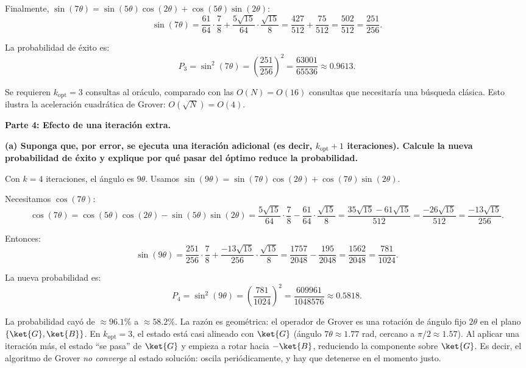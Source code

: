 Finalmente, $\sin(7\theta) = \sin(5\theta)\cos(2\theta) + \cos(5\theta)\sin(2\theta)$:
$$
    \sin(7\theta) = \frac{61}{64}\cdot\frac{7}{8} + \frac{5\sqrt{15}}{64}\cdot\frac{\sqrt{15}}{8} = \frac{427}{512} + \frac{75}{512} = \frac{502}{512} = \frac{251}{256}.
$$

La probabilidad de éxito es:
$$
    \boxed{P_3 = \sin^2(7\theta) = \left(\frac{251}{256}\right)^2 = \frac{63001}{65536} \approx 0.9613.}
$$

Se requieren $k_{\text{opt}} = 3$ consultas al oráculo, comparado con las $O(N) = O(16)$ consultas que necesitaría una búsqueda clásica. Esto ilustra la aceleración cuadrática de Grover: $O(\sqrt{N}) = O(4)$.

\vspace{0.5cm}

{\bfseries Parte 4: Efecto de una iteración extra.}

{\bfseries (a) Suponga que, por error, se ejecuta una iteración adicional (es decir, $k_{\text{opt}}+1$ iteraciones). Calcule la nueva probabilidad de éxito y explique por qué pasar del óptimo reduce la probabilidad.}

Con $k = 4$ iteraciones, el ángulo es $9\theta$. Usamos $\sin(9\theta) = \sin(7\theta)\cos(2\theta) + \cos(7\theta)\sin(2\theta)$.

Necesitamos $\cos(7\theta)$:
$$
    \cos(7\theta) = \cos(5\theta)\cos(2\theta) - \sin(5\theta)\sin(2\theta) = \frac{5\sqrt{15}}{64}\cdot\frac{7}{8} - \frac{61}{64}\cdot\frac{\sqrt{15}}{8} = \frac{35\sqrt{15} - 61\sqrt{15}}{512} = \frac{-26\sqrt{15}}{512} = \frac{-13\sqrt{15}}{256}.
$$

Entonces:
$$
    \sin(9\theta) = \frac{251}{256}\cdot\frac{7}{8} + \frac{-13\sqrt{15}}{256}\cdot\frac{\sqrt{15}}{8} = \frac{1757}{2048} - \frac{195}{2048} = \frac{1562}{2048} = \frac{781}{1024}.
$$

La nueva probabilidad es:
$$
    \boxed{P_4 = \sin^2(9\theta) = \left(\frac{781}{1024}\right)^2 = \frac{609961}{1048576} \approx 0.5818.}
$$

La probabilidad cayó de $\approx 96.1\%$ a $\approx 58.2\%$. La razón es geométrica: el operador de Grover es una rotación de ángulo fijo $2\theta$ en el plano $\{\ket{G}, \ket{B}\}$. En $k_{\text{opt}} = 3$, el estado está casi alineado con $\ket{G}$ (ángulo $7\theta \approx 1.77$ rad, cercano a $\pi/2 \approx 1.57$). Al aplicar una iteración más, el estado ``se pasa'' de $\ket{G}$ y empieza a rotar hacia $-\ket{B}$, reduciendo la componente sobre $\ket{G}$. Es decir, el algoritmo de Grover \emph{no converge} al estado solución: oscila periódicamente, y hay que detenerse en el momento justo.

